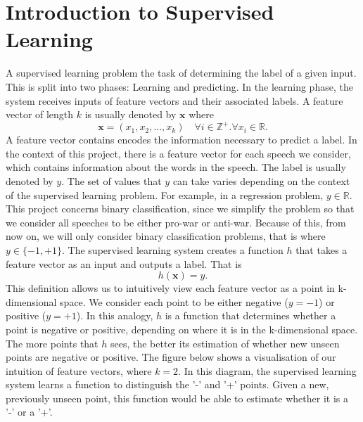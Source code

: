 \documentclass[12pt,a4paper,twoside,openright]{report}
\begin{document}
\section{Introduction to Supervised Learning} \label{supervised-learning}

A supervised learning problem the task of determining the label of a given input. This is split into two phases: Learning and predicting.
\newline
\newline
In the learning phase, the system receives inputs of feature vectors and their associated labels. A feature vector of length $k$ is usually denoted by $\mathbf{x}$ where 
\begin{equation}
	\mathbf{x} = (x_1, x_2, ..., x_k) \quad \forall i \in \mathbb{Z}^+ . \forall x_i \in \mathbb{R}.
\end{equation}
A feature vector contains encodes the information necessary to predict a label. In the context of this project, there is a feature vector for each speech we consider, which contains information about the words in the speech. The label is usually denoted by $y$. The set of values that $y$ can take varies depending on the context of the supervised learning problem. For example, in a regression problem, $y \in \mathbb{R}$. This project concerns binary classification, since we simplify the problem so that we consider all speeches to be either pro-war or anti-war. Because of this, from now on, we will only consider binary classification problems, that is where $y \in \{-1, +1\}$.
\newline
\newline
The supervised learning system creates a function $h$ that takes a feature vector as an input and outputs a label. That is
\begin{equation}
	h(\mathbf{x}) = y.
\end{equation}
This definition allows us to intuitively view each feature vector as a point in k-dimensional space. We consider each point to be either negative ($y = -1$) or positive ($y = +1$). In this analogy, $h$ is a function that determines whether a point is negative or positive, depending on where it is in the k-dimensional space. The more points that $h$ sees, the better its estimation of whether new unseen points are negative or positive.
\newline
\newline
The figure below shows a visualisation of our intuition of feature vectors, where $k = 2$. In this diagram, the supervised learning system learns a function to distinguish the '-' and '+' points. Given a new, previously unseen point, this function would be able to estimate whether it is a '-' or a '+'.
\end{document}
